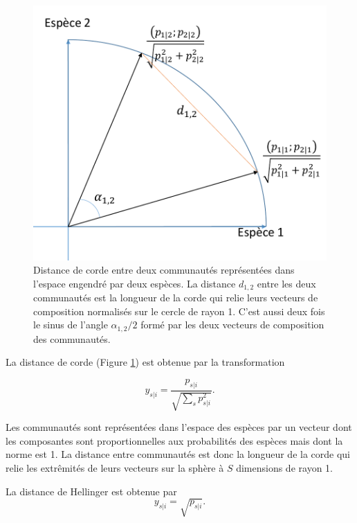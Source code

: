 \documentclass[
  11pt,
  french,
  a4paper,
  extrafontsizes,onecolumn,openright
  ]{memoir}
\begin{document}
\begin{figure}

{\centering \includegraphics[width=0.8\linewidth]{images/Corde} 

}

\caption{Distance de corde entre deux communautés représentées dans l'espace engendré par deux espèces. La distance \(d_{1,2}\) entre les deux communautés est la longueur de la corde qui relie leurs vecteurs de composition normalisés sur le cercle de rayon 1. C'est aussi deux fois le sinus de l'angle \({\alpha_{1,2}}/{2}\) formé par les deux vecteurs de composition des communautés.}\label{fig:Corde}
\end{figure}

\normalsize

La distance de corde (Figure \ref{fig:Corde}) est obtenue par la transformation

\begin{equation}
  \label{eq:Corde}
  y_{s|i} = \frac{p_{s|i}}{\sqrt{\sum_s{p_{s|i}^2}}}.
\end{equation}

Les communautés sont représentées dans l'espace des espèces par un vecteur dont les composantes sont proportionnelles aux probabilités des espèces mais dont la norme est 1.
La distance entre communautés est donc la longueur de la corde qui relie les extrêmités de leurs vecteurs sur la sphère à \(S\) dimensions de rayon 1.

La distance de Hellinger est obtenue par
\begin{equation}
  \label{eq:Hellinger}
  y_{s|i} = \sqrt{p_{s|i}}.
\end{equation}
\end{document}

